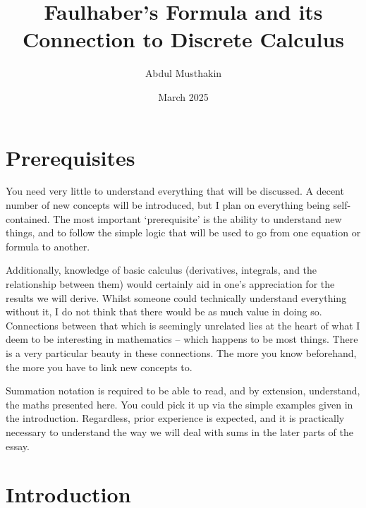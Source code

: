 \documentclass[a4paper]{article}
\title{Faulhaber's Formula and its Connection to Discrete Calculus}
\author{Abdul Musthakin}
\date{March 2025}
\theoremstyle{definition}
\begin{document}
\maketitle

\section{Prerequisites}

You need very little to understand everything that will be discussed.
A decent number of new concepts will be introduced, but I plan on everything being self-contained.
The most important `prerequisite' is the ability to understand new things, and to follow the simple logic that will be used to go from one equation or formula to another.

Additionally, knowledge of basic calculus (derivatives, integrals, and the relationship between them) would certainly aid in one's appreciation for the results we will derive.
Whilst someone could technically understand everything without it, I do not think that there would be as much value in doing so.
Connections between that which is seemingly unrelated lies at the heart of what I deem to be interesting in mathematics -- which happens to be most things.
There is a very particular beauty in these connections.
The more you know beforehand, the more you have to link new concepts to.

Summation notation is required to be able to read, and by extension, understand, the maths presented here.
You could pick it up via the simple examples given in the introduction.
Regardless, prior experience is expected, and it is practically necessary to understand the way we will deal with sums in the later parts of the essay.

\section{Introduction}
\end{document}
